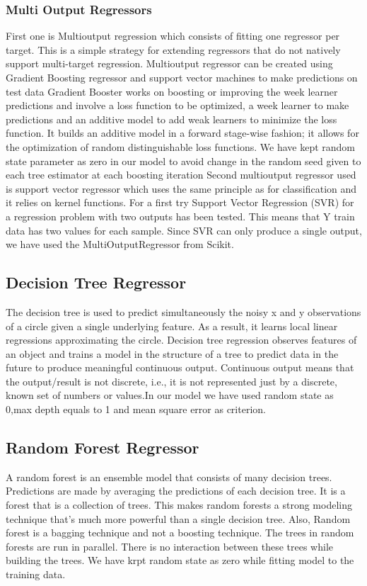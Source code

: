 \subsubsection{Multi Output Regressors}
First one is Multioutput regression which consists of fitting one regressor per target. This is a simple strategy for extending regressors that do not natively support multi-target regression. Multioutput regressor can be created using Gradient Boosting regressor and support vector machines to make predictions on test data %
Gradient Booster works on boosting or improving the week learner predictions and involve a loss function to be optimized, a week learner to make predictions and an additive model to add weak learners to minimize the loss function. It builds an additive model in a forward stage-wise fashion; it allows for the optimization of random distinguishable loss functions. We have kept random state parameter as zero in our model to avoid change in  the random seed given to each tree estimator at each boosting iteration %
Second multioutput regressor used is support vector regressor which uses the same principle as for classification and it relies on kernel functions. For a first try Support Vector Regression (SVR) for a regression problem with two outputs has been tested. This means that Y train data has two values for each sample. Since SVR can only produce a single output, we have used the MultiOutputRegressor from Scikit.
\subsection{Decision Tree Regressor}
The decision tree is used to predict simultaneously the noisy x and y observations of a circle given a single underlying feature. As a result, it learns local linear regressions approximating the circle. Decision tree regression observes features of an object and trains a model in the structure of a tree to predict data in the future to produce meaningful continuous output. Continuous output means that the output/result is not discrete, i.e., it is not represented just by a discrete, known set of numbers or values.In our model we have used random state as 0,max depth equals to 1 and mean square error as criterion.\newline
\subsection{Random Forest Regressor}
A random forest is an ensemble model that consists of many decision trees. Predictions are made by averaging the predictions of each decision tree. It is a forest that is a collection of trees. This makes random forests a strong modeling technique that’s much more powerful than a single decision tree. Also, Random forest is a bagging technique and not a boosting technique. The trees in random forests are run in parallel. There is no interaction between these trees while building the trees. We have krpt random state as zero while fitting model to the training data.\newline
